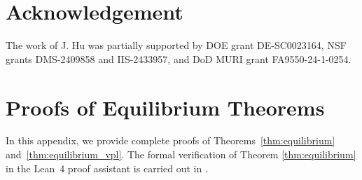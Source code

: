 \documentclass[]{article}
\numberwithin{equation}{section}
\begin{document}
\section*{Acknowledgement}
The work of J. Hu was partially supported by DOE grant DE-SC0023164, NSF grants DMS-2409858
and IIS-2433957, and DoD MURI grant FA9550-24-1-0254.


\appendix
\section{Proofs of Equilibrium Theorems}
\label{app:proofs_equilibrium}

In this appendix, we provide complete proofs of Theorems~\ref{thm:equilibrium} and~\ref{thm:equilibrium_vpl}. The formal verification of Theorem \ref{thm:equilibrium} in the Lean~4 proof assistant is carried out in \citep{ilin2026formalization}.
\end{document}

